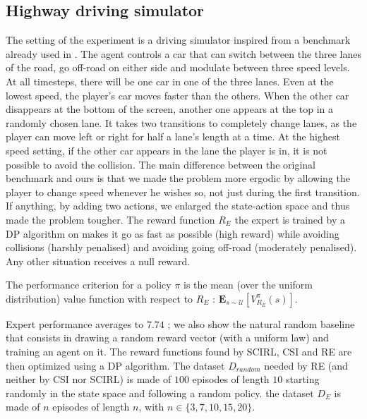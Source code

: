 \documentclass[smallextended]{svjour3}
\begin{document}
\subsection{Highway driving simulator}
\label{subsec:highway}
The setting of the experiment is a driving simulator inspired from a benchmark already used in \cite{syed2008apprenticeship,syed2008game}. The agent controls a car that can switch between the three lanes of the road, go off-road on either side and modulate between three speed levels. At all timesteps, there will be one car in one of the three lanes. Even at the lowest speed, the player's car moves faster than the others. When the other car disappears at the bottom of the screen, another one appears at the top in a randomly chosen lane. It takes two transitions to completely change lanes, as the player can move left or right for half a lane's length at a time. At the highest speed setting, if the other car appears in the lane the player is in, it is not possible to avoid the collision. The main difference between the original benchmark \cite{syed2008apprenticeship,syed2008game} and ours is that we made the problem more ergodic by allowing the player to change speed whenever he wishes so, not just during the first transition. If anything, by adding two actions, we enlarged the state-action space and thus made the problem tougher.
The reward function $R_E$ the expert is trained by a DP algorithm on makes it go as fast as possible (high reward) while avoiding collisions (harshly penalised) and avoiding going off-road (moderately penalised). Any other situation receives a null reward.


The performance criterion for a policy $\pi$ is the mean (over the uniform distribution) value function with respect to $R_E$ : $\mathbf{E}_{s\sim\mathcal{U}}[V^{\pi}_{R_E}(s)]$. 

Expert performance averages to $7.74$ ; we also show the natural random baseline that consists in drawing a random reward vector (with a uniform law) and training an agent on it. The reward functions found by SCIRL, CSI and RE are then optimized using a DP algorithm. The dataset $D_{random}$ needed by RE (and neither by CSI nor SCIRL) is made of $100$ episodes of length $10$ starting randomly in the state space and following a random policy. the dataset $D_E$ is made of $n$ episodes of length $n$, with $n \in \{3,7,10,15,20\}$.
\end{document}
